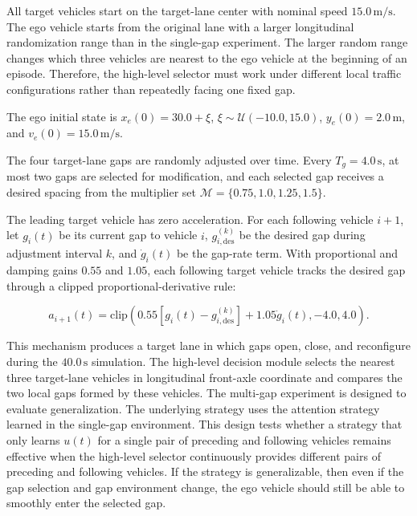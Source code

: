 All target vehicles start on the target-lane center with nominal speed \(15.0\,\mathrm{m/s}\). The ego vehicle starts from the original lane with a larger longitudinal randomization range than in the single-gap experiment. The larger random range changes which three vehicles are nearest to the ego vehicle at the beginning of an episode. Therefore, the high-level selector must work under different local traffic configurations rather than repeatedly facing one fixed gap.





The ego initial state is \(x_e(0)=30.0+\xi\), \(\xi\sim\mathcal{U}(-10.0,15.0)\), \(y_e(0)=2.0\,\mathrm{m}\), and \(v_e(0)=15.0\,\mathrm{m/s}\).





The four target-lane gaps are randomly adjusted over time. Every \(T_g=4.0\,\mathrm{s}\), at most two gaps are selected for modification, and each selected gap receives a desired spacing from the multiplier set \(\mathcal{M}=\{0.75,1.0,1.25,1.5\}\).





The leading target vehicle has zero acceleration. For each following vehicle \(i+1\), let \(g_i(t)\) be its current gap to vehicle \(i\), \(g_{i,\mathrm{des}}^{(k)}\) be the desired gap during adjustment interval \(k\), and \(\dot{g}_i(t)\) be the gap-rate term. With proportional and damping gains \(0.55\) and \(1.05\), each following target vehicle tracks the desired gap through a clipped proportional-derivative rule:



{\small
\begin{equation}
a_{i+1}(t)=
\mathrm{clip}
\left(
0.55\left[g_i(t)-g_{i,\mathrm{des}}^{(k)}\right]
 +1.05\dot{g}_i(t),
-4.0,
4.0
\right).
\end{equation}
}





This mechanism produces a target lane in which gaps open, close, and reconfigure during the \(40.0\,\mathrm{s}\) simulation. The high-level decision module selects the nearest three target-lane vehicles in longitudinal front-axle coordinate and compares the two local gaps formed by these vehicles. The multi-gap experiment is designed to evaluate generalization. The underlying strategy uses the attention strategy learned in the single-gap environment. This design tests whether a strategy that only learns \(u(t)\) for a single pair of preceding and following vehicles remains effective when the high-level selector continuously provides different pairs of preceding and following vehicles. If the strategy is generalizable, then even if the gap selection and gap environment change, the ego vehicle should still be able to smoothly enter the selected gap.





